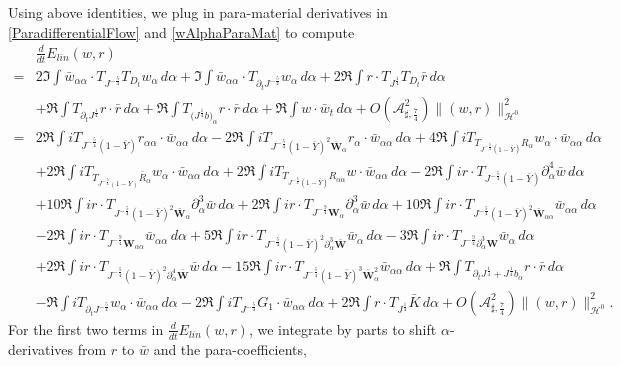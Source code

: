 \documentclass[10pt]{amsart}
\theoremstyle{remark}
\theoremstyle{definition}
\numberwithin{equation}{section}
\newcommand{\p}{\partial}
\renewcommand{\H}{{\mathcal H }}
\newcommand{\al}{\alpha}
\newcommand{\f}{\frac}
\newcommand{\bw}{\mathbf{W}}
\newcommand{\ASSharp}{{\mathcal{A}_{\sharp,\frac{7}{4}}^2}}
\begin{document}
Using above identities, we plug in para-material derivatives in \eqref{ParadifferentialFlow} and \eqref{wAlphaParaMat} to compute
\begin{align*}
&\frac{d}{dt} E_{lin}(w,r)\\
=& 2\Im \int \bar{w}_{\al \al} \cdot T_{J^{-\f54}}T_{D_t}w_\al \,d\alpha   
+  \Im \int \bar{w}_{\al \al} \cdot T_{\partial_tJ^{-\f54}}w_{\al} \,d\alpha + 2\Re \int r\cdot T_{J^{\f14}}T_{D_t}\bar{r} \, d\alpha \\
&+ \Re \int T_{\partial_t J^{\f14}}r\cdot \bar{r}\,d\alpha 
 + \Re \int T_{\big(J^{\f14}b\big)_\alpha}r\cdot \bar{r}\, d\alpha + \Re \int w\cdot \bar{w}_t \,d\al  + O\left(\ASSharp\right) \|(w,r)\|_{\H^0}^2 \\
=&2\Re \int iT_{J^{-\f54}(1-\bar{Y})}r_{\al \al}\cdot \bar{w}_{\al \al} \,d\alpha -2\Re \int iT_{J^{-\f54}(1-\bar{Y})^2 \bar{\bw}_\al}r_\al \cdot \bar{w}_{\al \al} \,d\al + 4\Re \int i T_{T_{J^{-\f54}(1-\bar{Y})}R_{\al}}w_\al \cdot \bar{w}_{\al \al} \,d\al \\
&+ 2\Re \int i T_{T_{J^{-\f54}(1-Y)}\bar{R}_{\al}}w_\al \cdot \bar{w}_{\al \al} \,d\al + 2\Re \int i T_{T_{J^{-\f54}(1-\bar{Y})}R_{\al\al}}w \cdot \bar{w}_{\al \al} \,d\al - 2\Re \int i r\cdot T_{J^{-\f54}(1-\bar{Y})} \p_\al^4 \bar{w} \,d\al \\
&+10\Re \int ir\cdot T_{J^{-\f54}(1-\bar{Y})^2 \bar{\bw}_\al} \p_\al^3 \bar{w} \,d\al +2\Re \int ir \cdot T_{J^{-\f94}\bw_\al}  \p_\al^3 \bar{w} \,d\al + 10\Re \int ir\cdot T_{J^{-\f54}(1-\bar{Y})^2\bar{\bw}_{\al \al}}\bar{w}_{\al \al}\,d\al \\
&- 2\Re \int ir \cdot T_{J^{-\f94}\bw_{\al \al}} \bar{w}_{\al \al} \,d\al + 5 \Re \int ir \cdot T_{J^{-\f54}(1-\bar{Y})^2 \p_\al^3 \bar{\bw}}\bar{w}_\al \,d\al - 3\Re \int ir \cdot T_{J^{-\f94}\p_\al^3 \bw} \bar{w}_{\al} \,d\al \\
&+2 \Re \int ir \cdot T_{J^{-\f54}(1-\bar{Y})^2 \p_\al^4 \bar{\bw}}\bar{w} \,d\al -15\Re \int ir \cdot T_{J^{-\f54}(1-\bar{Y})^3 \bar{\bw}_\al^2} \bar{w}_{\al \al} \,d\al + \Re \int T_{\partial_t J^{\f14} + J^{\f14} b_\al}r\cdot \bar{r}\,d\alpha\\
&-\Re \int iT_{\p_t J^{-\f54}}w_{\al}\cdot \bar{w}_{\al \al} \,d\alpha-2\Re \int i T_{J^{-\f54}}G_1 \cdot \bar{w}_{\al \al} \,d\al
+2 \Re \int r \cdot T_{J^{\f14}} \bar{K} \,d\al +  O\left(\ASSharp \right) \|(w,r)\|_{\H^0}^2.
\end{align*}
For the first two terms in $\frac{d}{dt} E_{lin}(w,r)$, we integrate by parts to shift $\alpha$-derivatives from $r$ to $\bar{w}$ and the para-coefficients,
\end{document}
